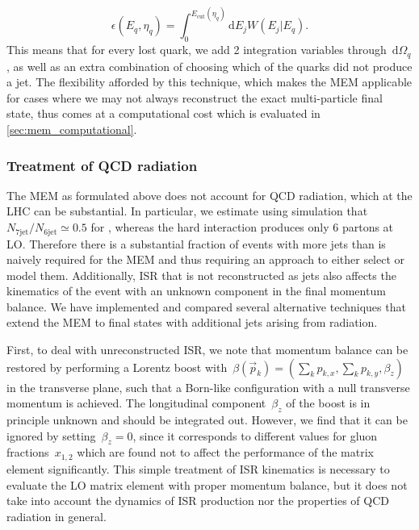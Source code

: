 \begin{equation}
\epsilon(E_q, \eta_q) = \int_0^{E_{\mathrm{cut}}(\eta_q)} \mathrm{d}E_j W(E_j | E_q).
\end{equation}
This means that for every lost quark, we add 2 integration variables through~$\mathrm{d}\Omega_q$, as well as an extra combination of choosing which of the quarks did not produce a jet. The flexibility afforded by this technique, which makes the MEM applicable for cases where we may not always reconstruct the exact multi-particle final state, thus comes at a computational cost which is evaluated in \cref{sec:mem_computational}.

\subsubsection{Treatment of QCD radiation}
\label{sec:mem_radiation}

The MEM as formulated above does not account for QCD radiation, which at the LHC can be substantial. In particular, we estimate using simulation that $N_{7\mathrm{jet}}/N_{6\mathrm{jet}} \simeq 0.5$ for \ttHbb, whereas the hard interaction produces only 6 partons at LO. Therefore there is a substantial fraction of events with more jets than is naively required for the MEM and thus requiring an approach to either select or model them. Additionally, ISR that is not reconstructed as jets also affects the kinematics of the event with an unknown component in the final momentum balance. We have implemented and compared several alternative techniques that extend the MEM to final states with additional jets arising from radiation.

First, to deal with unreconstructed ISR, we note that momentum balance can be restored by performing a Lorentz boost with~$\beta(\vec{p}_k) = (\sum_k p_{k,x}, \sum_k p_{k,y}, \beta_z)$ in the transverse plane, such that a Born-like configuration with a null transverse momentum is achieved. The longitudinal component~$\beta_z$ of the boost is in principle unknown and should be integrated out. However, we find that it can be ignored by setting~$\beta_z = 0$, since it corresponds to different values for gluon fractions~$x_{1,2}$ which are found not to affect the performance of the matrix element significantly. This simple treatment of ISR kinematics is necessary to evaluate the LO matrix element with proper momentum balance, but it does not take into account the dynamics of ISR production nor the properties of QCD radiation in general.

